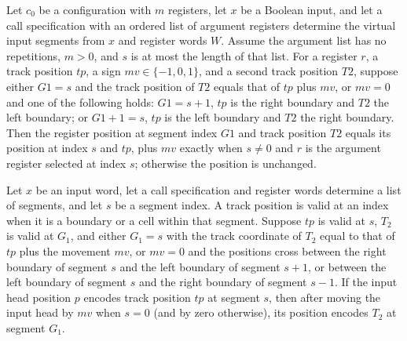 \begin{lemma}
\label{Complexity.LogProg.regPos_after}
\leanok
{}
Let $c_0$ be a configuration with $m$ registers, let $x$ be a Boolean input, and let a
call specification with an ordered list of argument registers determine the virtual
input segments from $x$ and register words $W$. Assume the argument list has no
repetitions, $m>0$, and $s$ is at most the length of that list. For a register $r$, a
track position $tp$, a sign $mv\in\{-1,0,1\}$, and a second track position $T2$, suppose
either $G1=s$ and the track position of $T2$ equals that of $tp$ plus $mv$, or $mv=0$
and one of the following holds: $G1=s+1$, $tp$ is the right boundary and $T2$ the left
boundary; or $G1+1=s$, $tp$ is the left boundary and $T2$ the right boundary. Then the
register position at segment index $G1$ and track position $T2$ equals its position at
index $s$ and $tp$, plus $mv$ exactly when $s\ne0$ and $r$ is the argument register
selected at index $s$; otherwise the position is unchanged.
\end{lemma}

\begin{lemma}
\label{Complexity.LogProg.inPos_after}
\leanok
{}
Let $x$ be an input word, let a call specification and register words determine a list
of segments, and let $s$ be a segment index. A track position is valid at an index when
it is a boundary or a cell within that segment. Suppose $tp$ is valid at $s$, $T_2$ is
valid at $G_1$, and either $G_1=s$ with the track coordinate of $T_2$ equal to that of
$tp$ plus the movement $mv$, or $mv=0$ and the positions cross between the right
boundary of segment $s$ and the left boundary of segment $s+1$, or between the left
boundary of segment $s$ and the right boundary of segment $s-1$. If the input head
position $p$ encodes track position $tp$ at segment $s$, then after moving the input
head by $mv$ when $s=0$ (and by zero otherwise), its position encodes $T_2$ at segment
$G_1$.
\end{lemma}

